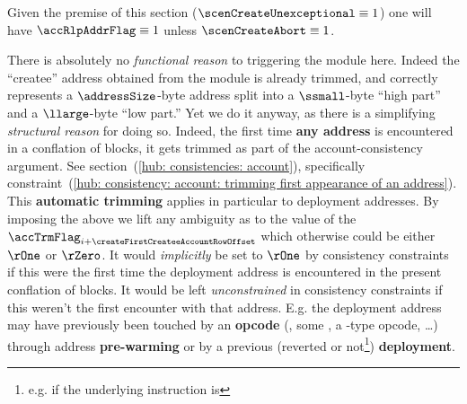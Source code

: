 \saNote{}
Given the premise of this section ($\scenCreateUnexceptional \equiv 1$) one will have $\accRlpAddrFlag \equiv 1$ unless $\scenCreateAbort \equiv 1$. 

\saNote{}
There is absolutely no \emph{functional reason} to triggering the \trmMod{} module here.
Indeed the ``createe'' address obtained from the \rlpAddrMod{} module is already trimmed,
and correctly represents a $\addressSize$-byte address split into a $\ssmall$-byte ``high part'' and a $\llarge$-byte ``low part.''
Yet we do it anyway, as there is a simplifying \emph{structural reason} for doing so.
Indeed, the first time \textbf{any address} is encountered in a conflation of blocks, it gets trimmed as part of the account-consistency argument.
See section~(\ref{hub: consistencies: account}),
specifically constraint~(\ref{hub: consistency: account: trimming first appearance of an address}).
This \textbf{automatic trimming} applies in particular to deployment addresses.
By imposing the above we lift any ambiguity as to the value of the $\accTrmFlag_{i + \createFirstCreateeAccountRowOffset}$ which otherwise could be either $\rOne$ or $\rZero$.
It would \emph{implicitly} be set to $\rOne$ by consistency constraints if this were the first time the deployment address is encountered in the present conflation of blocks.
It would be left \emph{unconstrained}        in consistency constraints if this weren't the first encounter with that address.
E.g. the deployment address may have previously been touched by an \textbf{opcode}
(, some , a -type opcode, \dots)
through address \textbf{pre-warming} or by a previous (reverted or not\footnote{e.g. if the underlying instruction is }) \textbf{deployment}.

